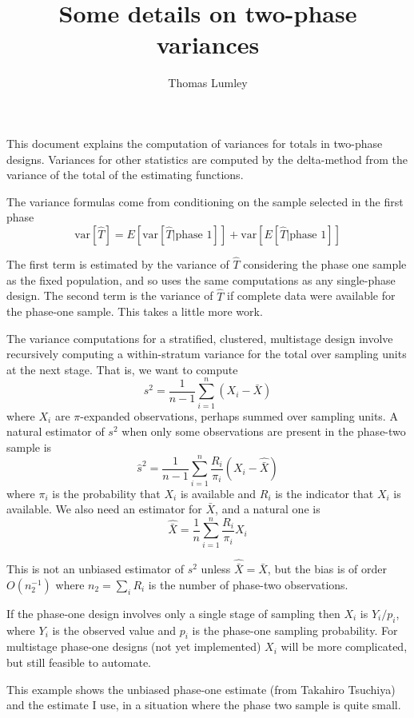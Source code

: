 \documentclass{article}
\author{Thomas Lumley}
\title{Some details on two-phase variances}
\begin{document}
\maketitle
This document explains the computation of variances for totals in
two-phase designs. Variances for other statistics are computed by the
delta-method from the variance of the total of the estimating
functions.

The variance formulas come from conditioning on the sample selected in
the first phase 
$$\textrm{var}[\hat T]=E\left[\textrm{var}\left[\hat T|\textrm{phase 1}\right]\right]+\textrm{var}\left[E\left[\hat T|\textrm{phase 1}\right]\right]$$

The first term is estimated by the variance of $\hat T$ considering
the phase one sample as the fixed population, and so uses the same
computations as any single-phase design. The second term is the
variance of $\hat T$ if complete data were available for the phase-one
sample. This takes a little more work.


The variance computations for a stratified, clustered, multistage
design involve recursively computing a within-stratum variance for the
total over sampling units at the next stage.  That is, we want to
compute 
$$s^2=\frac{1}{n-1}\sum_{i=1}^n (X_i-\bar X)$$
where $X_i$ are $\pi$-expanded observations, perhaps summed over sampling units.
A natural estimator of $s^2$ when only some observations are present in the phase-two sample is
$$\hat s^2=\frac{1}{n-1}\sum_{i=1}^n \frac{R_i}{\pi_i} (X_i-\hat{\bar X})$$
where $\pi_i$ is the probability that $X_i$ is available and $R_i$ is the indicator that $X_i$ is available.  We also need an estimator for $\bar X$, and a natural one is
$$\hat{\bar X}=\frac{1}{n}\sum_{i=1}^n \frac{R_i}{\pi_i}X_i$$

This is not an unbiased estimator of $s^2$ unless $\hat{\bar X}=\bar X$,
but the bias is of order $O(n_2^{-1})$ where $n_2=\sum_i R_i$ is the
number of phase-two observations.

If the phase-one design involves only a single stage of sampling then
$X_i$ is $Y_i/p_i$, where $Y_i$ is the observed value and $p_i$ is the
phase-one sampling probability.  For multistage phase-one designs (not
yet implemented) $X_i$ will be more complicated, but still feasible to
automate.

This example shows the unbiased phase-one estimate (from Takahiro
Tsuchiya) and the estimate I use, in a situation where the phase two
sample is quite small.
\end{document}
